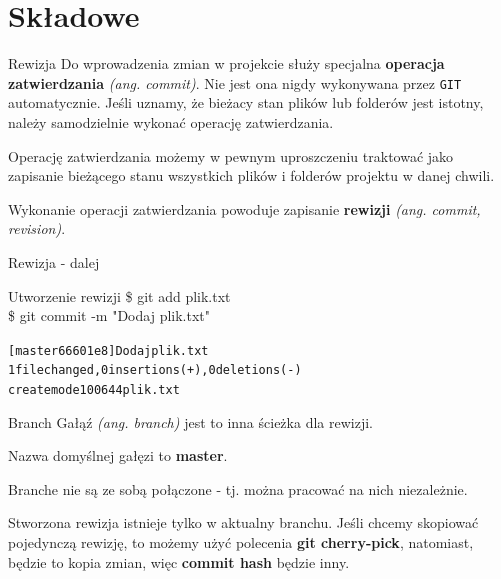 \documentclass{beamer}
\begin{document}

\section{Składowe}

\begin{frame}{Rewizja}
Do wprowadzenia zmian w projekcie służy specjalna \textbf{operacja zatwierdzania} \textit{(ang. commit)}. Nie jest ona nigdy wykonywana przez \texttt{GIT} automatycznie. Jeśli uznamy, że bieżacy stan plików lub folderów jest istotny, należy samodzielnie wykonać operację zatwierdzania.

\vskip 0.5cm
Operację zatwierdzania możemy w pewnym uproszczeniu traktować jako zapisanie bieżącego stanu wszystkich plików i folderów 
projektu w danej chwili.

\vskip 0.5cm
Wykonanie operacji zatwierdzania powoduje zapisanie \textbf{rewizji} \textit{(ang. commit, revision)}.
\end{frame}

\begin{frame}{Rewizja - dalej}
\begin{block}{Utworzenie rewizji}
\$ git add plik.txt \\
\$ git commit -m "Dodaj plik.txt"
\begin{alltt}
[master 66601e8] Dodaj plik.txt \\
 1 file changed, 0 insertions(+), 0 deletions(-) \\
 create mode 100644 plik.txt
\end{alltt}
\end{block}
\end{frame}

\begin{frame}{Branch}
Gałąź \textit{(ang. branch)} jest to inna ścieżka dla rewizji.

Nazwa domyślnej gałęzi to \textbf{master}.

Branche nie są ze sobą połączone - tj. można pracować na nich niezależnie.

Stworzona rewizja istnieje tylko w aktualny branchu.
Jeśli chcemy skopiować pojedynczą rewizję, to możemy użyć polecenia \textbf{git cherry-pick},
natomiast, będzie to kopia zmian, więc \textbf{commit hash} będzie inny.
\end{frame}
\end{document}
